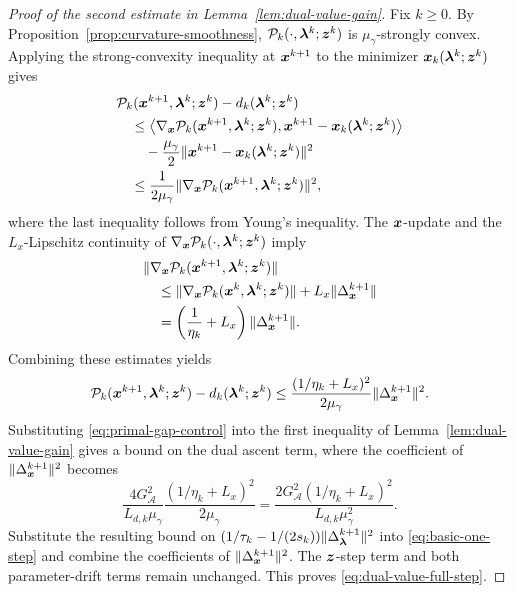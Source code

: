 \begin{proof}[Proof of the second estimate in Lemma~\ref{lem:dual-value-gain}]
Fix $k\ge0$. By Proposition~\ref{prop:curvature-smoothness},
$\mathcal P_k(\cdot,\bm{\lambda}^k;\bm{z}^k)$ is
$\mu_\gamma$-strongly convex. Applying the strong-convexity inequality
at $\bm{x}^{k+1}$ to the minimizer $\bm{x}_k(\bm{\lambda}^k;\bm{z}^k)$ gives
\[
\begin{aligned}
&\mathcal P_k(\bm{x}^{k+1},\bm{\lambda}^k;\bm{z}^k)-d_k(\bm{\lambda}^k;\bm{z}^k) \\
&\quad\le
\left\langle
\nabla_{\bm{x}}\mathcal P_k(\bm{x}^{k+1},\bm{\lambda}^k;\bm{z}^k),
\bm{x}^{k+1}-\bm{x}_k(\bm{\lambda}^k;\bm{z}^k)
\right\rangle \\
&\qquad
-\frac{\mu_\gamma}{2}
\|\bm{x}^{k+1}-\bm{x}_k(\bm{\lambda}^k;\bm{z}^k)\|^2 \\
&\quad\le
\frac{1}{2\mu_\gamma}
\|\nabla_{\bm{x}}\mathcal P_k(\bm{x}^{k+1},\bm{\lambda}^k;\bm{z}^k)\|^2,
\end{aligned}
\]
where the last inequality follows from Young's inequality.
The $\bm{x}$-update and the $L_x$-Lipschitz continuity of
$\nabla_{\bm{x}}\mathcal P_k(\cdot,\bm{\lambda}^k;\bm{z}^k)$ imply
\[
\begin{aligned}
&\|\nabla_{\bm{x}}\mathcal P_k(\bm{x}^{k+1},\bm{\lambda}^k;\bm{z}^k)\| \\
&\quad\le
\|\nabla_{\bm{x}}\mathcal P_k(\bm{x}^k,\bm{\lambda}^k;\bm{z}^k)\|
+L_x\|\Delta_{\bm{x}}^{k+1}\| \\
&\quad=
\left(\frac{1}{\eta_k}+L_x\right)
\|\Delta_{\bm{x}}^{k+1}\|.
\end{aligned}
\]
Combining these estimates yields
\begin{equation}
\label{eq:primal-gap-control}
\mathcal P_k(\bm{x}^{k+1},\bm{\lambda}^k;\bm{z}^k)
-d_k(\bm{\lambda}^k;\bm{z}^k)
\le
\frac{(1/\eta_k+L_x)^2}{2\mu_\gamma}
\|\Delta_{\bm{x}}^{k+1}\|^2.
\end{equation}
Substituting \eqref{eq:primal-gap-control} into the first inequality of
Lemma~\ref{lem:dual-value-gain} gives a bound on the dual ascent term,
where the coefficient of
$\|\Delta_{\bm{x}}^{k+1}\|^2$ becomes
\[
\frac{4G_{\mathcal A}^2}{L_{d,k}\mu_\gamma}
\frac{(1/\eta_k+L_x)^2}{2\mu_\gamma}
=
\frac{2G_{\mathcal A}^2(1/\eta_k+L_x)^2}
{L_{d,k}\mu_\gamma^2}.
\]
Substitute the resulting bound on
$(1/\tau_k-1/(2s_k))\|\Delta_{\bm{\lambda}}^{k+1}\|^2$
into \eqref{eq:basic-one-step} and combine the coefficients of
$\|\Delta_{\bm{x}}^{k+1}\|^2$. The $\bm{z}$-step term and both parameter-drift
terms remain unchanged. This proves \eqref{eq:dual-value-full-step}.
\end{proof}

